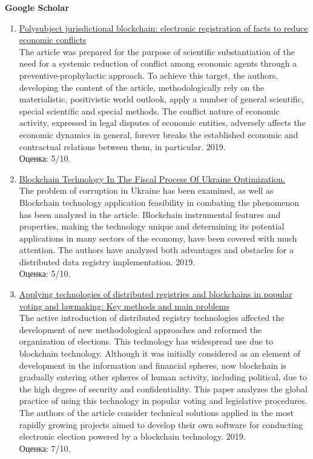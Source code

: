 \documentclass[a4paper, 12pt]{report}		%
\begin{document}
\textbf{Google Scholar}

\begin{enumerate}
\item \href{https://link.springer.com/chapter/10.1007/978-3-030-13397-9_24}{Polysubject jurisdictional blockchain: electronic registration of facts to reduce economic conflicts}\\
The article was prepared for the purpose of scientific substantiation of the need for a systemic reduction of conflict among economic agents through a preventive-prophylactic approach. To achieve this target, the authors, developing the content of the article, methodologically rely on the materialistic, positivistic world outlook, apply a number of general scientific, special scientific and special methods. The conflict nature of economic activity, expressed in legal disputes of economic entities, adversely affects the economic dynamics in general, forever breaks the established economic and contractual relations between them, in particular. 2019.\\
Оценка: 5/10.
\item \href{https://www.ceeol.com/search/article-detail?id=813586}{Blockchain Technology In The Fiscal Process Of Ukraine Optimization.}\\
The problem of corruption in Ukraine has been examined, as well as Blockchain technology application feasibility in combating the phenomenon has been analyzed in the article. Blockchain instrumental features and properties, making the technology unique and determining its potential applications in many sectors of the economy, have been covered with much attention. The authors have analyzed both advantages and obstacles for a distributed data registry implementation. 2019.\\
Оценка: 5/10.
\item \href{https://amazoniainvestiga.info/index.php/amazonia/article/view/147}{Applying technologies of distributed registries and blockchains in popular voting and lawmaking: Key methods and main problems}\\
The active introduction of distributed registry technologies affected the development of new methodological approaches and reformed the organization of elections. This technology has widespread use due to blockchain technology. Although it was initially considered as an element of development in the information and financial spheres, now blockchain is gradually entering other spheres of human activity, including political, due to the high degree of security and confidentiality. This paper analyzes the global practice of using this technology in popular voting and legislative procedures. The authors of the article consider technical solutions applied in the most rapidly growing projects aimed to develop their own software for conducting electronic election powered by a blockchain technology. 2019.\\
Оценка: 7/10.
\end{enumerate}
\end{document}
